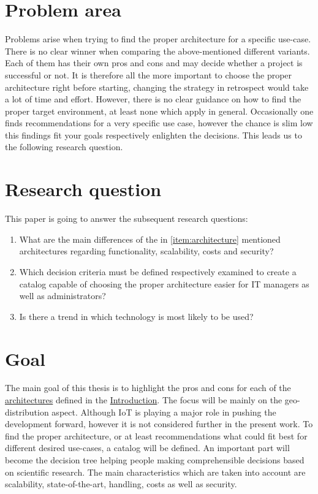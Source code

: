 \documentclass[MSC,Master,english]{twbook}%
\begin{document}
\section{Problem area}
Problems arise when trying to find the proper architecture for a specific use-case. There is no clear winner when comparing the above-mentioned different variants. Each of them  has their own pros and cons and may decide whether a project is successful or not. It is therefore all the more important to choose the proper architecture right before starting, changing the strategy in retrospect would take a lot of time and effort. However, there is no clear guidance on how to find the proper target environment, at least none which apply in general. Occasionally one finds recommendations for a very specific use case, however the chance is slim low this findings fit your goals respectively enlighten the decisions. This leads us to the following research question.

\section{Research question}
\label{sec:rq}
This paper is going to answer the subsequent research questions:
\begin{enumerate}
    \item What are the main differences of the in \autoref{item:architecture} mentioned architectures regarding functionality, scalability, costs and security?
    \item Which decision criteria must be defined respectively examined to create a catalog capable
    of choosing the proper architecture easier for \ac{IT} managers as well as administrators?
    \item Is there a trend in which technology is most likely to be used?
\end{enumerate}

\section{Goal}
\label{sec:goal}
The main goal of this thesis is to highlight the pros and cons for each of the \hyperref[item:architecture]{architectures} defined in the \hyperref[chap:introduction]{Introduction}. The focus will be mainly on the geo-distribution aspect. Although \ac{IoT} is playing a major role in pushing the development forward, however it is not considered further in the present work. To find the proper architecture, or at least recommendations what could fit best for different desired use-cases, a catalog will be defined. An important part will become the decision tree helping people making comprehensible decisions based on scientific research. The main characteristics which are taken into account are scalability, state-of-the-art, handling, costs as well as security.
\end{document}
